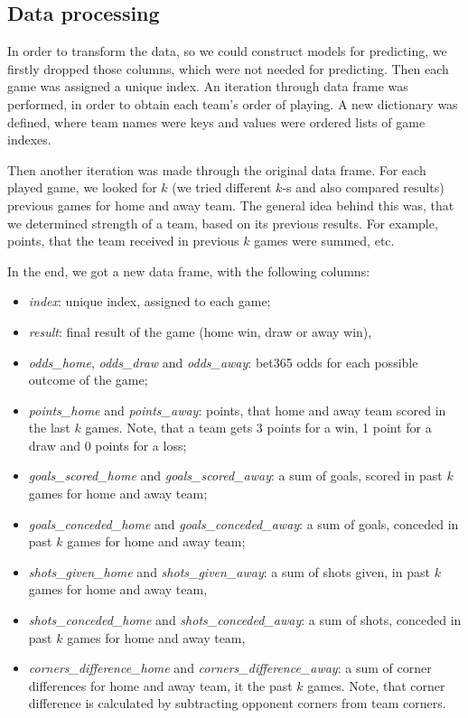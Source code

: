 \documentclass[conference]{IEEEtran}
\begin{document}
\subsection{Data processing}

In order to transform the data, so we could construct models for predicting, we firstly 
dropped those columns, which were not needed for predicting. Then each game was assigned a 
unique index. An iteration through data frame was performed, in order to obtain each team's
order of playing. A new dictionary was defined, where team names were keys and values were
ordered lists of game indexes. 

Then another iteration was made through the original data frame. For each played game, we
looked for $k$ (we tried different $k$-s and also compared results) previous games for home 
and away team. The general idea behind this was, that we determined strength of a team, 
based on its previous results. For example, points, that the team received in previous $k$ 
games were summed, etc.

In the end, we got a new data frame, with the following columns:
\begin{itemize}
    \item \textit{index}: unique index, assigned to each game;
    \item \textit{result}: final result of the game (home win, draw or away win),
    \item \textit{odds\_home}, \textit{odds\_draw} and \textit{odds\_away}: bet365 odds for each possible outcome of the game;
    \item \textit{points\_home} and \textit{points\_away}: points, that home and away team scored in the last $k$ games. Note,
    that a team gets 3 points for a win, 1 point for a draw and 0 points for a loss;
    \item \textit{goals\_scored\_home} and \textit{goals\_scored\_away}: a sum of goals, scored in past $k$ games for home and away
    team;
    \item \textit{goals\_conceded\_home} and \textit{goals\_conceded\_away}: a sum of goals, conceded in past $k$ games for home 
    and away team;
    \item \textit{shots\_given\_home} and \textit{shots\_given\_away}: a sum of shots given, in past $k$ games for home 
    and away team,
    \item \textit{shots\_conceded\_home} and \textit{shots\_conceded\_away}: a sum of shots, conceded in past $k$ games for home 
    and away team,
    \item \textit{corners\_difference\_home} and \textit{corners\_difference\_away}: a sum of corner differences for home and away 
    team, it the past $k$ games. Note, that corner difference is calculated by subtracting opponent corners from team corners. 
\end{itemize}
\end{document}

